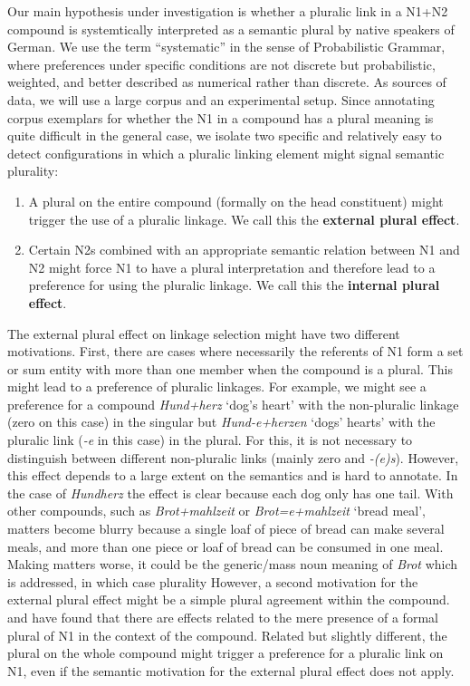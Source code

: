 Our main hypothesis under investigation is whether a pluralic link in a N1+N2 compound is systemtically interpreted as a semantic plural by native speakers of German.
We use the term ``systematic'' in the sense of Probabilistic Grammar, where preferences under specific conditions are not discrete but probabilistic, weighted, and better described as numerical rather than discrete.
As sources of data, we will use a large corpus and an experimental setup.
Since annotating corpus exemplars for whether the N1 in a compound has a plural meaning is quite difficult in the general case, we isolate two specific and relatively easy to detect configurations in which a pluralic linking element might signal semantic plurality:

\vspace{\baselineskip}

\begin{enumerate}
  \item A plural on the entire compound (formally on the head constituent) might trigger the use of a pluralic linkage.
  We call this the \textbf{external plural effect}.
  \item Certain N2s combined with an appropriate semantic relation between N1 and N2 might force N1 to have a plural interpretation and therefore lead to a preference for using the pluralic linkage.
  We call this the \textbf{internal plural effect}.
\end{enumerate}

\vspace{\baselineskip}

The external plural effect on linkage selection might have two different motivations.
First, there are cases where necessarily the referents of N1 form a set or sum entity with more than one member when the compound is a plural.
This might lead to a preference of pluralic linkages.
For example, we might see a preference for a compound \textit{Hund+herz} `dog's heart' with the non-pluralic linkage (zero on this case) in the singular but \textit{Hund-e+herzen} `dogs' hearts' with the pluralic link (\textit{-e} in this case) in the plural.
For this, it is not necessary to distinguish between different non-pluralic links (mainly zero and \textit{-(e)s}).
However, this effect depends to a large extent on the semantics and is hard to annotate.
In the case of \textit{Hundherz} the effect is clear because each dog only has one tail.
With other compounds, such as \textit{Brot+mahlzeit} or \textit{Brot=e+mahlzeit} `bread meal', matters become blurry because a single loaf of piece of bread can make several meals, and more than one piece or loaf of bread can be consumed in one meal.
Making matters worse, it could be the generic\slash mass noun meaning of \textit{Brot} which is addressed, in which case plurality
However, a second motivation for the external plural effect might be a simple plural agreement within the compound.
\textcite{BangaEa2013a} and \textcite{BangaEa2013b} have found that there are effects related to the mere presence of a formal plural of N1 in the context of the compound.
Related but slightly different, the plural on the whole compound might trigger a preference for a pluralic link on N1, even if the semantic motivation for the external plural effect does not apply.

